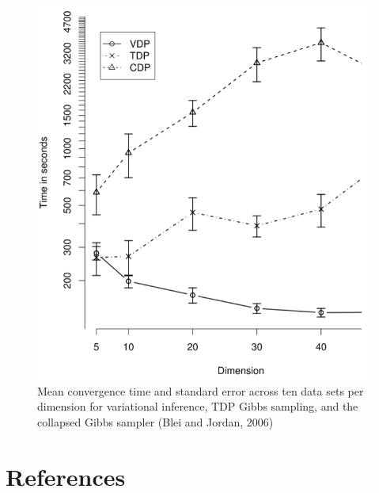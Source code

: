 \documentclass{article}
\begin{document}
\begin{figure}[!htp]
	\centering
	\includegraphics[scale=0.3]{figures/speed.png}
	\caption{Mean convergence time and standard error across ten data sets per dimension for variational inference, TDP Gibbs sampling, and the collapsed Gibbs sampler (Blei and Jordan, 2006)}
\end{figure}



\section*{References}
\end{document}

